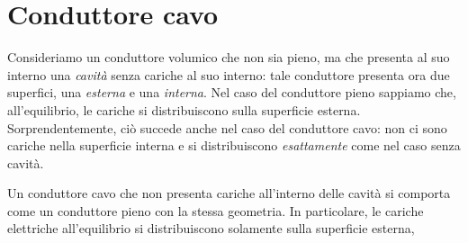 \section{Conduttore cavo}
Consideriamo un conduttore volumico che non sia pieno, ma che presenta al suo interno una \textit{cavità} senza cariche al suo interno: tale conduttore presenta ora due superfici, una \textit{esterna} e una \textit{interna}. Nel caso del conduttore pieno sappiamo che, all'equilibrio, le cariche si distribuiscono sulla superficie esterna.\\
Sorprendentemente, ciò succede anche nel caso del conduttore cavo: non ci sono cariche nella superficie interna e si distribuiscono \textit{esattamente} come nel caso senza cavità.
\begin{proposition}
	Un conduttore cavo che non presenta cariche all'interno delle cavità si comporta come un conduttore pieno con la stessa geometria. In particolare, le cariche elettriche all'equilibrio si distribuiscono solamente sulla superficie esterna,
\end{proposition}
